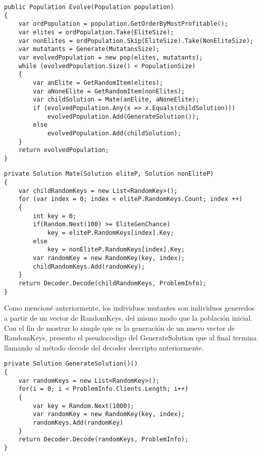 \bigskip

\begin{minipage}{\textwidth}
\begin{lstlisting}
public Population Evolve(Population population)
{
    var ordPopulation = population.GetOrderByMostProfitable();
    var elites = ordPopulation.Take(EliteSize);
    var nonElites = ordPopulation.Skip(EliteSize).Take(NonEliteSize);
    var mutatants = Generate(MutatansSize);
    var evolvedPopulation = new pop(elites, mutatants);
    while (evolvedPopulation.Size() < PopulationSize)
    {
		var anElite = GetRandomItem(elites);
		var aNoneElite = GetRandomItem(nonElites);
        var childSolution = Mate(anElite, aNoneElite);
        if (evolvedPopulation.Any(x => x.Equals(childSolution)))
            evolvedPopulation.Add(GenerateSolution());
        else
            evolvedPopulation.Add(childSolution);
    }
    return evolvedPopulation;
}
\end{lstlisting}
\end{minipage}

\begin{minipage}{\textwidth}
\begin{lstlisting}
private Solution Mate(Solution eliteP, Solution nonEliteP)
{
	var childRandomKeys = new List<RandomKey>();
	for (var index = 0; index < eliteP.RandomKeys.Count; index ++)
	{
		int key = 0;
		if(Random.Next(100) >= EliteGenChance)
			key = eliteP.RandomKeys[index].Key;
		else
			key = nonEliteP.RandomKeys[index].Key;
		var randomKey = new RandomKey(key, index);
		childRandomKeys.Add(randomKey);
	}
	return Decoder.Decode(childRandomKeys, ProblemInfo);
}
\end{lstlisting}
\end{minipage}

\bigskip

Como mencioné anteriormente, los individuos mutantes son individuos generedos a partir de un vector de RandomKeys, del mismo modo que la población inicial. Con el fín de mostrar lo simple que es la generación de un nuevo vector de RandomKeys, presento el pseudocodigo del GenerateSolution que al final termina llamando al método decode del decoder descripto anteriormente.

\bigskip

\begin{minipage}{\textwidth}
\begin{lstlisting}
private Solution GenerateSolution()()
{
	var randomKeys = new List<RandomKey>();
	for(i = 0; i < ProblemInfo.Clients.Length; i++)
	{
		var key = Random.Next(1000);
		var randomKey = new RandomKey(key, index);
		randomKeys.Add(randomKey)
	}
	return Decoder.Decode(randomKeys, ProblemInfo);
}
\end{lstlisting}
\end{minipage}

